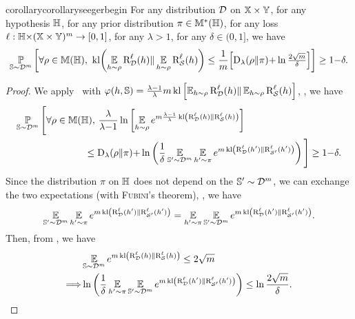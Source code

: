 \begin{noaddcontents}
\begin{restatable}{corollary}{corollaryseegerbegin}
For any distribution $\mathcal{D}$ on $\mathbb{X}\times\mathbb{Y}$, for any hypothesis $\mathbb{H}$, for any prior distribution $\pi\in\mathbb{M}^{*}(\mathbb{H})$, for any loss $\ell: \mathbb{H}{\times}(\mathbb{X}\times\mathbb{Y})^m \to [0, 1]$, for any $\lambda>1$, for any $\delta\in(0, 1]$, we have
\begin{align*}
    \operatorname*{\mathbb{P}}_{\mathbb{S}\sim\mathcal{D}^m}\left[\forall\rho\in\mathbb{M}(\mathbb{H}),\   \operatorname{kl}\!\left(\operatorname*{\mathbb{E}}_{h\sim\rho}\text{R}^{\ell}_{\mathcal{D}}(h)\|\operatorname*{\mathbb{E}}_{h\sim\rho}\text{R}^{\ell}_{\mathcal{S}}(h)\right) \le \frac{1}{m}\!\left[\operatorname{D}_{\lambda}(\rho\|\pi){+}\ln\tfrac{2\sqrt{m}}{\delta}\right]\right] \ge 1{-}\delta.    
\end{align*}
\label{ap:pac-bayes:corollary:seeger-begin}
\end{restatable}
\begin{proof}
We apply~ with   $\varphi(h, \mathbb{S})=\frac{\lambda{-}1}{\lambda}m\operatorname{kl}\left[\operatorname*{\mathbb{E}}_{h\sim\rho}\text{R}^{\ell}_{\mathcal{D}}(h)\|\operatorname*{\mathbb{E}}_{h\sim\rho}\text{R}^{\ell}_{\mathcal{S}}(h)\right]$, \ie, we have
\begin{align*}
    \PP_{\S\sim\D^\m}\Bigg[\forall\Q\in\M(\H),\   &\frac{\lambda}{\lambda{-}1}\ln \LB\EE_{\h{\sim}\Q}e^{\m\frac{\lambda{-}1}{\lambda}\kl\LP\RiskLoss_{\D}(\h)\|\RiskLoss_{\dS}(\h)\RP}\RB\\
    &\hspace{-0.5cm}\le \Renyi_{\lambda}(\Q\|\P){+}\ln\LP\frac{1}{\delta}\EE_{\S'\sim\D^\m}\EE_{\h'\sim\P}e^{\m\kl\LP\RiskLoss_{\D}(\h')\|\RiskLoss_{\dS'}(\h')\RP}\RP\Bigg] \ge 1{-}\delta.
\end{align*}
Since the distribution $\pi$ on $\mathbb{H}$ does not depend on the $\mathbb{S}'\sim\mathcal{D}^m$, we can exchange the two expectations (with \textsc{Fubini}'s theorem), \ie, we have 
\begin{align*}
\operatorname*{\mathbb{E}}_{\mathbb{S}'\sim\mathcal{D}^m}\operatorname*{\mathbb{E}}_{h'\sim\pi}e^{m\operatorname{kl}\left(\text{R}^{\ell}_{\mathcal{D}}(h')\|\text{R}^{\ell}_{\mathcal{S}'}(h')\right)} = \operatorname*{\mathbb{E}}_{h'\sim\pi}\operatorname*{\mathbb{E}}_{\mathbb{S}'\sim\mathcal{D}^m}e^{m\operatorname{kl}\left(\text{R}^{\ell}_{\mathcal{D}}(h')\|\text{R}^{\ell}_{\mathcal{S}'}(h')\right)}.
\end{align*}
Then, from , we have
\begin{align*}
    &\operatorname*{\mathbb{E}}_{\mathbb{S}\sim\mathcal{D}^m}e^{m\operatorname{kl}\left(\text{R}^{\ell}_{\mathcal{D}}(h)\|\text{R}^{\ell}_{\mathcal{S}}(h)\right)} \le 2\sqrt{m}\\
    \Longrightarrow & \ln\left(\frac{1}{\delta}\operatorname*{\mathbb{E}}_{h'\sim\pi}\operatorname*{\mathbb{E}}_{\mathbb{S}'\sim\mathcal{D}^m}e^{m\operatorname{kl}\left(\text{R}^{\ell}_{\mathcal{D}}(h')\|\text{R}^{\ell}_{\mathcal{S}'}(h')\right)}\right) \le \ln\frac{2\sqrt{m}}{\delta}.
\end{align*}


\end{proof}
\end{noaddcontents}
